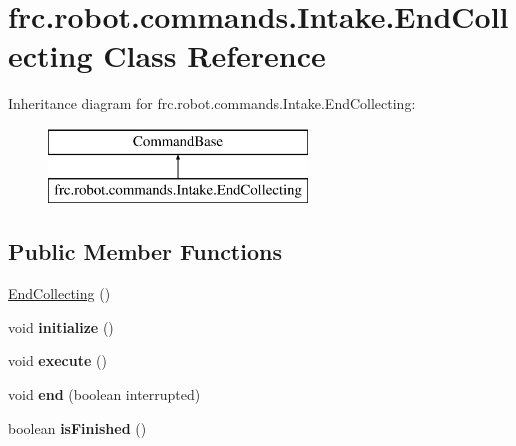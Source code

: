 \hypertarget{classfrc_1_1robot_1_1commands_1_1_intake_1_1_end_collecting}{}\section{frc.\+robot.\+commands.\+Intake.\+End\+Collecting Class Reference}
\label{classfrc_1_1robot_1_1commands_1_1_intake_1_1_end_collecting}
Inheritance diagram for frc.\+robot.\+commands.\+Intake.\+End\+Collecting\+:\begin{figure}[H]
\begin{center}
\leavevmode
\includegraphics[height=2.000000cm]{classfrc_1_1robot_1_1commands_1_1_intake_1_1_end_collecting}
\end{center}
\end{figure}
\subsection*{Public Member Functions}
\begin{DoxyCompactItemize}
\item 
\mbox{\hyperlink{classfrc_1_1robot_1_1commands_1_1_intake_1_1_end_collecting_aec353232e9424d6b1a5c125006c4b57c}{End\+Collecting}} ()
\item 
\mbox{\label{classfrc_1_1robot_1_1commands_1_1_intake_1_1_end_collecting_a6596e9d28af42b02a5a08900202a30d7}} 
void {\bfseries initialize} ()
\item 
\mbox{\label{classfrc_1_1robot_1_1commands_1_1_intake_1_1_end_collecting_a80dea564d06db830adc985d3ca97149b}} 
void {\bfseries execute} ()
\item 
\mbox{\label{classfrc_1_1robot_1_1commands_1_1_intake_1_1_end_collecting_a3630b3f24388173145e145e63f3309c2}} 
void {\bfseries end} (boolean interrupted)
\item 
\mbox{\label{classfrc_1_1robot_1_1commands_1_1_intake_1_1_end_collecting_a9cdad6bd91d2b48909e61b41cac135e4}} 
boolean {\bfseries is\+Finished} ()
\end{DoxyCompactItemize}


